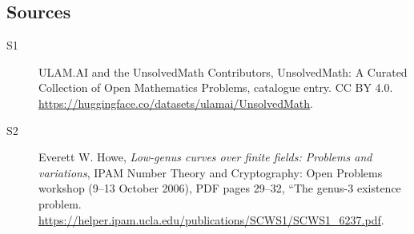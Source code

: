 \documentclass[11pt]{article}
\begin{document}
\subsection{Sources}
\begin{description}
\item[\hypertarget{source:statement:1}{S1}] ULAM.AI and the UnsolvedMath Contributors, UnsolvedMath: A Curated Collection of Open Mathematics Problems, catalogue entry. CC BY 4.0. \url{https://huggingface.co/datasets/ulamai/UnsolvedMath}.
\item[\hypertarget{source:statement:2}{S2}] Everett W. Howe, \emph{Low-genus curves over finite fields: Problems and variations}, IPAM Number Theory and Cryptography: Open Problems workshop (9--13 October 2006), PDF pages 29--32, ``The genus-3 existence problem. \url{https://helper.ipam.ucla.edu/publications/SCWS1/SCWS1_6237.pdf}.
\end{description}
\label{end:statement}
\end{document}
